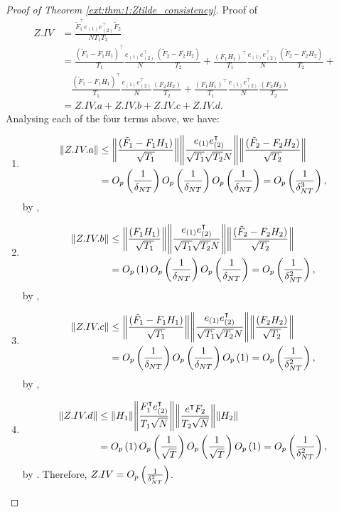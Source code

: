 \documentclass[12pt]{article}
\newcommand*{\tran}{\intercal}
\theoremstyle{plain}
\numberwithin{equation}{section}
\begin{document}
\begin{proof}[Proof of Theorem \ref{ext:thm:1:Ztilde_consistency}]
Proof of 
\begin{align*}
Z.IV
&= \frac{\tilde{F}_1^\tran e_{(1)} e_{(2)}^\tran \tilde{F}_2}{N T_1 T_2} \\
&= \frac{(\tilde{F}_1 - F_1 H_1)^\tran}{T_1} 
\frac{e_{(1)} e_{(2)}^\tran}{N} 
\frac{(\tilde{F}_2 - F_2 H_2)}{T_2} +
\frac{(F_1 H_1)^\tran}{T_1} 
\frac{e_{(1)} e_{(2)}^\tran}{N} 
\frac{(\tilde{F}_2 - F_2 H_2)}{T_2} + \\
&\quad 
\frac{(\tilde{F}_1 - F_1 H_1)^\tran}{T_1} 
\frac{e_{(1)} e_{(2)}^\tran}{N} 
\frac{(F_2 H_2)}{T_2} +
\frac{(F_1 H_1)^\tran}{T_1} 
\frac{e_{(1)} e_{(2)}^\tran}{N} 
\frac{(F_2 H_2)}{T_2} \\
&= Z.IV.a + Z.IV.b + Z.IV.c + Z.IV.d.
\end{align*}
Analysing each of the four terms above, we have:
\begin{enumerate}
\item 
\begin{align*}
\norm{Z.IV.a} 
&\leq 
\norm{\frac{(\tilde{F}_1 - F_1 H_1)}{\sqrt{T_1}}} 
\norm{\frac{e_{(1)} e_{(2)}^\tran}{\sqrt{T_1} \sqrt{T_2}N}} 
\norm{\frac{(\tilde{F}_2 - F_2 H_2)}{\sqrt{T_2}}} \\
&= \Opdelta \Opdelta \Opdelta = \Op{\frac{1}{\delta_{NT}^3}},
\end{align*}
by ,
\item 
\begin{align*}
\norm{Z.IV.b} 
&\leq 
\norm{\frac{(F_1 H_1)}{\sqrt{T_1}}}
\norm{\frac{e_{(1)} e_{(2)}^\tran}{\sqrt{T_1} \sqrt{T_2}N}}
\norm{\frac{(\tilde{F}_2 - F_2 H_2)}{\sqrt{T_2}}} \\
&= \Op{1} \Opdelta \Opdelta = \Opdeltasq,
\end{align*}
by ,
\item 
\begin{align*}
\norm{Z.IV.c} 
&\leq
\norm{\frac{(\tilde{F}_1 - F_1 H_1)}{\sqrt{T_1}} }
\norm{\frac{e_{(1)} e_{(2)}^\tran}{\sqrt{T_1} \sqrt{T_2} N} }
\norm{\frac{(F_2 H_2)}{\sqrt{T_2}}} \\
&= \Opdelta \Opdelta \Op{1} = \Opdeltasq,
\end{align*}
by ,
\item 
\begin{align*}
\norm{Z.IV.d} 
&\leq
\norm{H_1}
\norm{\frac{F_1^\tran e_{(2)}^\tran}{T_1 \sqrt{N}} }
\norm{\frac{e^\tran F_2}{T_2 \sqrt{N}}}
\norm{H_2} \\
&= \Op{1} \OprtT \OprtT \Op{1} = \Opdeltasq,
\end{align*}
by .
Therefore, $Z.IV = O_p\left( \frac{1}{\delta_{NT}^2}\right)$.
\end{enumerate}


\end{proof}
\end{document}
